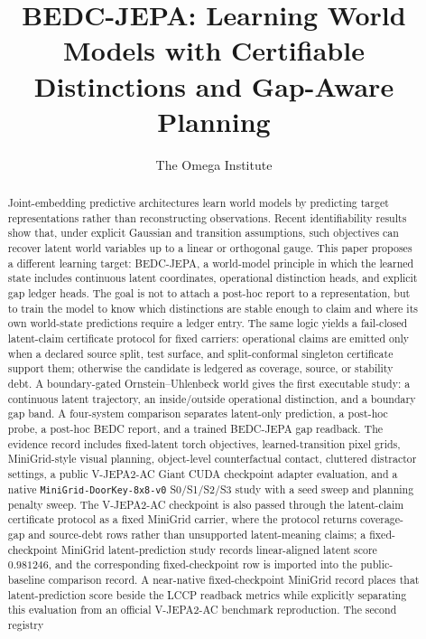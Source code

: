 \documentclass[11pt]{article}
\title{BEDC-JEPA: Learning World Models with Certifiable Distinctions and Gap-Aware Planning}
\author{The Omega Institute}
\date{}
\begin{document}
\maketitle

\begin{abstract}
Joint-embedding predictive architectures learn world models by predicting
target representations rather than reconstructing observations.  Recent
identifiability results show that, under explicit Gaussian and transition
assumptions, such objectives can recover latent world variables up to a linear
or orthogonal gauge.  This paper proposes a different learning target:
BEDC-JEPA, a world-model principle in which the learned state includes
continuous latent coordinates, operational distinction heads, and explicit gap
ledger heads.  The goal is not to attach a post-hoc report to a representation,
but to train the model to know which distinctions are stable enough to claim
and where its own world-state predictions require a ledger entry.  The same
logic yields a fail-closed latent-claim certificate protocol for fixed
carriers: operational claims are emitted only when a declared source split,
test surface, and split-conformal singleton certificate support them; otherwise
the candidate is ledgered as coverage, source, or stability debt.  A
boundary-gated Ornstein--Uhlenbeck world gives the first executable study:
a continuous latent trajectory, an inside/outside operational distinction, and
a boundary gap band.  A four-system comparison separates latent-only
prediction, a post-hoc probe, a post-hoc BEDC report, and a trained BEDC-JEPA
gap readback.  The evidence record includes fixed-latent torch objectives,
learned-transition pixel grids, MiniGrid-style visual planning, object-level
counterfactual contact, cluttered distractor settings, a public V-JEPA2-AC
Giant CUDA checkpoint adapter evaluation, and a native
\texttt{MiniGrid-DoorKey-8x8-v0} S0/S1/S2/S3 study with a seed sweep and
planning penalty sweep.  The V-JEPA2-AC checkpoint is also passed through the
latent-claim certificate protocol as a fixed MiniGrid carrier, where the
protocol returns coverage-gap and source-debt rows rather than unsupported
latent-meaning claims; a fixed-checkpoint MiniGrid latent-prediction study
records linear-aligned latent score $0.981246$, and the corresponding
fixed-checkpoint row is imported into the public-baseline comparison record.  A
near-native fixed-checkpoint MiniGrid record places that latent-prediction score
beside the LCCP readback metrics while explicitly separating this evaluation
from an official V-JEPA2-AC benchmark reproduction.  The second registry

\end{abstract}
\end{document}
